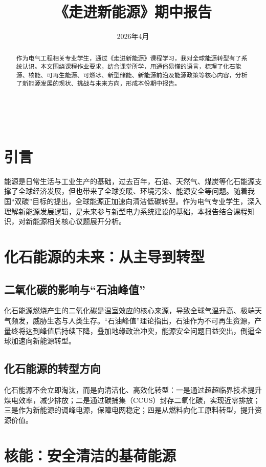 \documentclass[UTF8,a4paper,12pt]{article}
\title{\bfseries 《走进新能源》期中报告}
\author{}
\date{2026年4月}
\begin{document}
\maketitle

\\[2em]

\begin{abstract}
作为电气工程相关专业学生，通过《走进新能源》课程学习，我对全球能源转型有了系统认识。本文围绕课程作业要求，结合课堂所学，用通俗易懂的语言，梳理了化石能源、核能、可再生能源、可燃冰、新型储能、新能源前沿及能源政策等核心内容，分析了新能源发展的现状、挑战与未来方向，形成本份期中报告。
\end{abstract}

\section{引言}
能源是日常生活与工业生产的基础，过去百年，石油、天然气、煤炭等化石能源支撑了全球经济发展，但也带来了全球变暖、环境污染、能源安全等问题。随着我国“双碳”目标的提出，全球能源正加速向清洁低碳转型。作为电气专业学生，深入理解新能源发展逻辑，是未来参与新型电力系统建设的基础，本报告结合课程知识，对新能源相关核心议题展开分析。

\section{化石能源的未来：从主导到转型}
\subsection{二氧化碳的影响与“石油峰值”}
化石能源燃烧产生的二氧化碳是温室效应的核心来源，导致全球气温升高、极端天气频发，威胁生态与人类生存。“石油峰值”理论指出，石油作为不可再生资源，产量终将达到峰值后持续下降，叠加地缘政治冲突，能源安全问题日益突出，倒逼全球加速向新能源转型。

\subsection{化石能源的转型方向}
化石能源不会立即淘汰，而是向清洁化、高效化转型：一是通过超超临界技术提升煤电效率，减少排放；二是通过碳捕集（CCUS）封存二氧化碳，实现近零排放；三是作为新能源的调峰电源，保障电网稳定；四是从燃料向化工原料转型，提升资源价值。

\section{核能：安全清洁的基荷能源}
\end{document}
